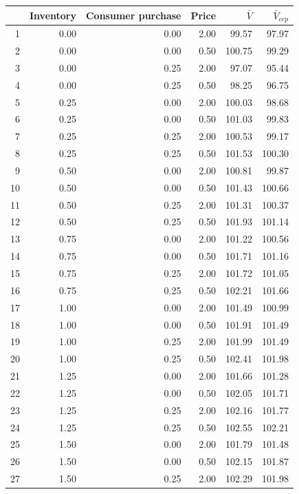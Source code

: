 \begin{tabular}{rrrrrr}
  \hline
 & Inventory & Consumer purchase & Price & $\bar{V}$ & $\bar{V}_{ccp}$ \\ 
  \hline
1 & 0.00 & 0.00 & 2.00 & 99.57 & 97.97 \\ 
  2 & 0.00 & 0.00 & 0.50 & 100.75 & 99.29 \\ 
  3 & 0.00 & 0.25 & 2.00 & 97.07 & 95.44 \\ 
  4 & 0.00 & 0.25 & 0.50 & 98.25 & 96.75 \\ 
  5 & 0.25 & 0.00 & 2.00 & 100.03 & 98.68 \\ 
  6 & 0.25 & 0.00 & 0.50 & 101.03 & 99.83 \\ 
  7 & 0.25 & 0.25 & 2.00 & 100.53 & 99.17 \\ 
  8 & 0.25 & 0.25 & 0.50 & 101.53 & 100.30 \\ 
  9 & 0.50 & 0.00 & 2.00 & 100.81 & 99.87 \\ 
  10 & 0.50 & 0.00 & 0.50 & 101.43 & 100.66 \\ 
  11 & 0.50 & 0.25 & 2.00 & 101.31 & 100.37 \\ 
  12 & 0.50 & 0.25 & 0.50 & 101.93 & 101.14 \\ 
  13 & 0.75 & 0.00 & 2.00 & 101.22 & 100.56 \\ 
  14 & 0.75 & 0.00 & 0.50 & 101.71 & 101.16 \\ 
  15 & 0.75 & 0.25 & 2.00 & 101.72 & 101.05 \\ 
  16 & 0.75 & 0.25 & 0.50 & 102.21 & 101.66 \\ 
  17 & 1.00 & 0.00 & 2.00 & 101.49 & 100.99 \\ 
  18 & 1.00 & 0.00 & 0.50 & 101.91 & 101.49 \\ 
  19 & 1.00 & 0.25 & 2.00 & 101.99 & 101.49 \\ 
  20 & 1.00 & 0.25 & 0.50 & 102.41 & 101.98 \\ 
  21 & 1.25 & 0.00 & 2.00 & 101.66 & 101.28 \\ 
  22 & 1.25 & 0.00 & 0.50 & 102.05 & 101.71 \\ 
  23 & 1.25 & 0.25 & 2.00 & 102.16 & 101.77 \\ 
  24 & 1.25 & 0.25 & 0.50 & 102.55 & 102.21 \\ 
  25 & 1.50 & 0.00 & 2.00 & 101.79 & 101.48 \\ 
  26 & 1.50 & 0.00 & 0.50 & 102.15 & 101.87 \\ 
  27 & 1.50 & 0.25 & 2.00 & 102.29 & 101.98 \\ 

\end{tabular}

